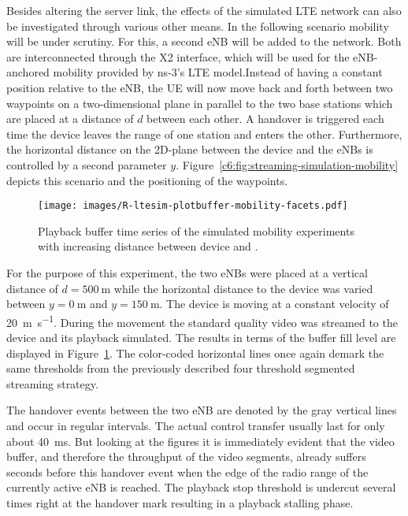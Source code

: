Besides altering the server link, the effects of the simulated \gls{LTE} network can also be investigated through various other means. In the following scenario mobility will be under scrutiny. For this, a second \gls{eNB} will be added to the network. Both are interconnected through the X2 interface, which will be used for the \gls{eNB}-anchored mobility provided by ns-3's \gls{LTE} model.\@ Instead of having a constant position relative to the \gls{eNB}, the \gls{UE} will now move back and forth between two waypoints on a two-dimensional plane in parallel to the two base stations which are placed at a distance of $d$ between each other. A handover is triggered each time the device leaves the range of one station and enters the other. Furthermore, the horizontal distance on the 2D-plane between the device and the \glspl{eNB} is controlled by a second parameter $y$. Figure~\ref{c6:fig:streaming-simulation-mobility} depicts this scenario and the positioning of the waypoints.

\begin{figure}[htb]
	\centering
	\texttt{[image: images/R-ltesim-plotbuffer-mobility-facets.pdf]}
	\caption{Playback buffer time series of the simulated mobility experiments with increasing distance between device and .}
\label{c6:fig:ltesim-mobility-plotbuffer-facets}
\end{figure}

For the purpose of this experiment, the two \glspl{eNB} were placed at a vertical distance of $d=\SI{500}{\meter}$ while the horizontal distance to the device was varied between $y=\SI{0}{\meter}$ and $y=\SI{150}{\meter}$. The device is moving at a constant velocity of \SI{20}{\meter\per\second}. During the movement the standard quality video was streamed to the device and its playback simulated. The results in terms of the buffer fill level are displayed in Figure~\ref{c6:fig:ltesim-mobility-plotbuffer-facets}. The color-coded horizontal lines once again demark the same thresholds from the previously described four threshold segmented streaming strategy.

The handover events between the two \gls{eNB} are denoted by the gray vertical lines and occur in regular intervals. The actual control transfer usually last for only about \SI{40}{\milli\second}. But looking at the figures it is immediately evident that the video buffer, and therefore the throughput of the video segments, already suffers seconds before this handover event when the edge of the radio range of the currently active \gls{eNB} is reached. The playback stop threshold is undercut several times right at the handover mark resulting in a playback stalling phase.

